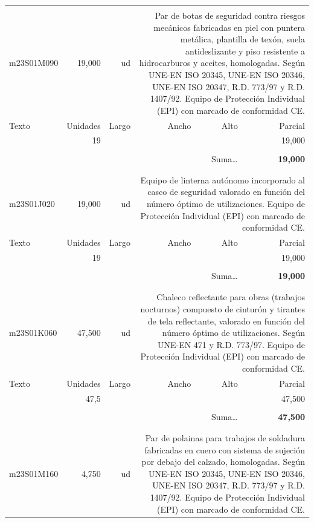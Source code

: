 \documentclass{book}%
\begin{document}
\begin{longtable}{lrrrrr}
&&&&&\\%
m23S01M090&    19,000& ud&\multicolumn{3}{p{6cm}}{\scriptsize Par de botas de seguridad contra riesgos mecánicos fabricadas en piel con puntera metálica, plantilla de texón, suela antideslizante y piso resistente a hidrocarburos y aceites, homologadas. Según UNE-EN ISO 20345, UNE-EN ISO 20346, UNE-EN ISO 20347, R.D. 773/97 y R.D. 1407/92. Equipo de Protección Individual (EPI) con marcado de conformidad CE.\normalsize}\\%
Texto&Unidades&Largo&Ancho&Alto&Parcial\\%
\hline%
\multicolumn{1}{p{3.5cm}}{ }&19&&&&    19,000\\%
&&&&&\\%
\multicolumn{5}{r}{Suma\ldots}&\textbf{    19,000}\\%
\hline%
&&&&&\\%
&&&&&\\%
m23S01J020&    19,000& ud&\multicolumn{3}{p{6cm}}{\scriptsize Equipo de linterna autónomo incorporado al casco de seguridad valorado en función del número óptimo de utilizaciones. Equipo de Protección Individual (EPI) con marcado de conformidad CE.\normalsize}\\%
Texto&Unidades&Largo&Ancho&Alto&Parcial\\%
\hline%
\multicolumn{1}{p{3.5cm}}{ }&19&&&&    19,000\\%
&&&&&\\%
\multicolumn{5}{r}{Suma\ldots}&\textbf{    19,000}\\%
\hline%
&&&&&\\%
&&&&&\\%
m23S01K060&    47,500& ud&\multicolumn{3}{p{6cm}}{\scriptsize Chaleco reflectante para obras (trabajos nocturnos) compuesto de cinturón y tirantes de tela reflectante, valorado en función del número óptimo de utilizaciones. Según UNE-EN 471 y R.D. 773/97. Equipo de Protección Individual (EPI) con marcado de conformidad CE.\normalsize}\\%
Texto&Unidades&Largo&Ancho&Alto&Parcial\\%
\hline%
\multicolumn{1}{p{3.5cm}}{ }&47,5&&&&    47,500\\%
&&&&&\\%
\multicolumn{5}{r}{Suma\ldots}&\textbf{    47,500}\\%
\hline%
&&&&&\\%
&&&&&\\%
m23S01M160&     4,750& ud&\multicolumn{3}{p{6cm}}{\scriptsize Par de polainas para trabajos de soldadura fabricadas en cuero con sistema de sujeción por debajo del calzado, homologadas. Según UNE-EN ISO 20345, UNE-EN ISO 20346, UNE-EN ISO 20347, R.D. 773/97 y R.D. 1407/92. Equipo de Protección Individual (EPI) con marcado de conformidad CE.\normalsize}\\%

\end{longtable}
\end{document}
